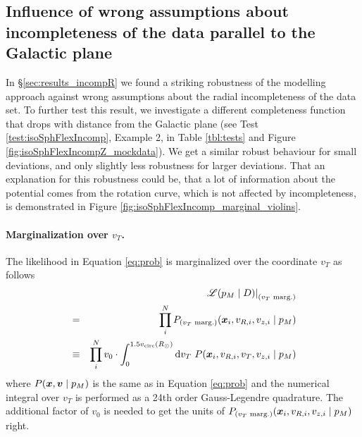 \subsection{Influence of wrong assumptions about incompleteness of the data parallel to the Galactic plane} \label{sec:incompZ}

In \S\ref{sec:results_incompR} we found a striking robustness of the \RM modelling approach against wrong assumptions about the radial incompleteness of the data set. To further test this result, we investigate a different completeness function that drops with distance from the Galactic plane (see Test \ref{test:isoSphFlexIncomp}, Example 2, in Table \ref{tbl:tests} and Figure \ref{fig:isoSphFlexIncompZ_mockdata}). We get a similar robust behaviour for small deviations, and only slightly less robustness for larger deviations. That an explanation for this robustness could be, that a lot of information about the potential comes from the rotation curve, which is not affected by incompleteness, is demonstrated in Figure \ref{fig:isoSphFlexIncomp_marginal_violins}.

\paragraph{Marginalization over $v_T$.} The likelihood in Equation \ref{eq:prob} is marginalized over the coordinate $v_T$ as follows
\begin{eqnarray*}
&&\left. \mathscr{L}(p_M \mid D)\right|_\text{($v_T$ marg.)}\\
&=& \prod_i^N P_\text{($v_T$ marg.)} (\boldsymbol{x}_i,v_{R,i},v_{z,i} \mid p_M)\\
&\equiv& \prod_i^N v_0 \cdot \int_0^{1.5v_\text{circ}(R_\odot)} \mathop{}\!\mathrm{d} v_T \ P(\boldsymbol{x}_i,v_{R,i},v_{T},v_{z,i} \mid p_M )
\end{eqnarray*}
where $P(\boldsymbol{x},\boldsymbol{v} \mid p_M)$ is the same as in Equation \ref{eq:prob} and the numerical integral over $v_T$ is performed as a 24th order Gauss-Legendre quadrature. The additional factor of $v_0$ is needed to get the units of $P_\text{($v_T$ marg.)} (\boldsymbol{x}_i,v_{R,i},v_{z,i} \mid p_M)$ right.

